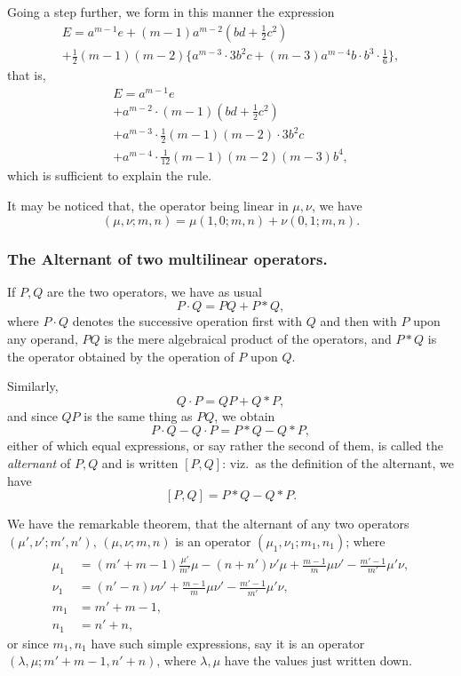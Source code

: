\documentclass[11pt,a4paper]{book}
\begin{document}
\newpage
\noindent Going a step further, we form in this manner the expression
\begin{multline*}
E = a^{m-1}e + (m-1)a^{m-2}(bd + \tfrac{1}{2}c^2) \\
+ \tfrac{1}{2}(m-1)(m-2)\{a^{m-3} \cdot 3b^2c + (m-3)a^{m-4}b \cdot b^3 \cdot \tfrac{1}{6}\},
\end{multline*}
that is,
\begin{multline*}
E = a^{m-1}e \\
+ a^{m-2} \cdot (m-1)(bd + \tfrac{1}{2}c^2) \\
+ a^{m-3} \cdot \tfrac{1}{2}(m-1)(m-2) \cdot 3b^2c \\
+ a^{m-4} \cdot \tfrac{1}{12}(m-1)(m-2)(m-3)b^4,
\end{multline*}
which is sufficient to explain the rule.

It may be noticed that, the operator being linear in $\mu, \nu$, we have
\[
(\mu, \nu; m, n) = \mu(1, 0; m, n) + \nu(0, 1; m, n).
\]

\subsubsection*{The Alternant of two multilinear operators.}

If $P, Q$ are the two operators, we have as usual
\[
P \cdot Q = PQ + P * Q,
\]
where $P \cdot Q$ denotes the successive operation first with $Q$ and then with $P$ upon any
operand, $PQ$ is the mere algebraical product of the operators, and $P * Q$ is the operator
obtained by the operation of $P$ upon $Q$.

Similarly,
\[
Q \cdot P = QP + Q * P,
\]
and since $QP$ is the same thing as $PQ$, we obtain
\[
P \cdot Q - Q \cdot P = P * Q - Q * P,
\]
either of which equal expressions, or say rather the second of them, is called the
\textit{alternant} of $P, Q$ and is written $[P, Q]$: viz.\ as the definition of the alternant, we have
\[
[P, Q] = P * Q - Q * P.
\]

We have the remarkable theorem, that the alternant of any two operators $(\mu', \nu'; m', n')$,
$(\mu, \nu; m, n)$ is an operator $(\mu_1, \nu_1; m_1, n_1)$; where
\begin{align*}
\mu_1 &= (m' + m - 1)\frac{\mu'}{m'}\mu - (n + n')\nu'\mu + \frac{m - 1}{m}\mu\nu' - \frac{m' - 1}{m'}\mu'\nu, \\
\nu_1 &= (n' - n)\nu\nu' + \frac{m - 1}{m}\mu\nu' - \frac{m' - 1}{m'}\mu'\nu, \\
m_1 &= m' + m - 1, \\
n_1 &= n' + n,
\end{align*}
or since $m_1, n_1$ have such simple expressions, say it is an operator $(\lambda, \mu; m' + m - 1, n' + n)$,
where $\lambda, \mu$ have the values just written down.
\end{document}
